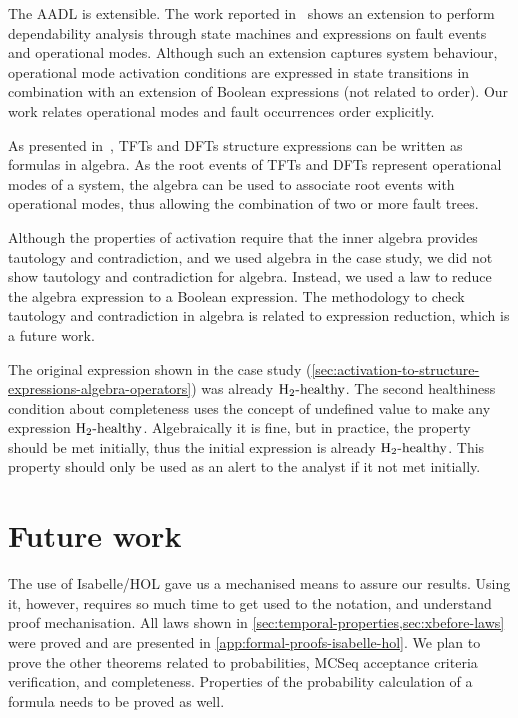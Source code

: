 
The \ac{AADL} is extensible. 
The work reported in~\cite{SAEAS55061A} shows an extension to perform dependability analysis through state machines and expressions on fault events and operational modes.
Although such an extension captures system behaviour, operational mode activation conditions are expressed in state transitions in combination with an extension of Boolean expressions (not related to order).
Our work relates operational modes and fault occurrences order explicitly.

As presented in~\cite{DM2016}, \acp{TFT} and \acp{DFT} structure expressions can be written as formulas in \ac{algebra}.
As the root events of \acp{TFT} and \acp{DFT} represent operational modes of a system, the \ac{algebra} can be used to associate root events with operational modes, thus allowing the combination of two or more fault trees.

Although the properties of \ac{activation} require that the inner algebra provides tautology and contradiction, and we used \ac{algebra} in the case study, we did not show tautology and contradiction for \ac{algebra}. 
Instead, we used a law to reduce the \ac{algebra} expression to a Boolean expression.
The methodology to check tautology and contradiction in \ac{algebra} is related to expression reduction, which is a future work.

The original expression shown in the case study (\cref{sec:activation-to-structure-expressions-algebra-operators}) was already $\healthy[2]$.
The second healthiness condition about completeness uses the concept of undefined value to make any expression $\healthy[2]$.
Algebraically it is fine, but in practice, the property should be met initially, thus the initial expression is already $\healthy[2]$.
This property should only be used as an alert to the analyst if it not met initially.

\section{Future work}

The use of Isabelle/HOL gave us a mechanised means to assure our results.
Using it, however, requires so much time to get used to the notation, and understand proof mechanisation.
All laws shown in \cref{sec:temporal-properties,sec:xbefore-laws} were proved and are presented in \cref{app:formal-proofs-isabelle-hol}.
We plan to prove the other theorems related to probabilities, \ac{MCSeq} acceptance criteria verification, and completeness.
Properties of the probability calculation of a formula needs to be proved as well.

